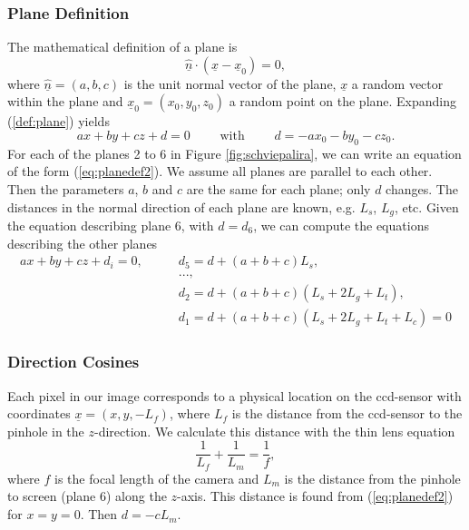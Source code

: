 \documentclass[draft]{svjour3}                     %
\begin{document}
\subsubsection{Plane Definition}
The mathematical definition of a plane is
\begin{equation}
	\label{def:plane}
	\underline{\hat{n}} \cdot (\underline{x}-\underline{x}_0) = 0,
\end{equation}
where $\underline{\hat{n}} = (a,b,c)$ is the unit normal vector of the plane, $\underline{x}$ a random vector within the plane and $\underline{x}_0=(x_0, y_0, z_0)$ a random point on the plane. Expanding (\ref{def:plane}) yields
\begin{equation}
	\label{eq:planedef2}
	ax+by+cz + d = 0 \qquad \mbox{ with } \qquad d = - a x_0 - b y_0 - c z_0.
\end{equation}
For each of the planes 2 to 6 in Figure \ref{fig:schviepalira}, we can write an equation of the form (\ref{eq:planedef2}). We assume all planes are parallel to each other. Then the parameters $a$, $b$ and $c$ are the same for each plane; only $d$ changes. The distances in the normal direction of each plane are known, e.g. $L_s$, $L_g$, etc. Given the equation describing plane 6, with $d=d_6$,
we can compute the equations describing the other planes
\begin{align}
a x + b y + c z + d_i = 0, \qquad  
& d_5 = d + (a+b+c) L_s, \nonumber \\
& ..., \nonumber \\ 
& d_2 = d + (a+b+c) (L_s+2L_g+L_t), \nonumber \\
\label{eq:planedef1}
& d_1 = d + (a+b+c) (L_s+2L_g+L_t+L_c) = 0 
\end{align}

\subsubsection{Direction Cosines}
Each pixel in our image corresponds to a physical location on the ccd-sensor with coordinates $\underline{x} = (x,y, -L_f)$, where $L_f$ is the distance from the ccd-sensor to the pinhole in the $z$-direction. We calculate this distance with the thin lens equation
\begin{equation}
 \frac{1}{L_f} + \frac{1}{L_m} = \frac{1}{f},
\end{equation}
where $f$ is the focal length of the camera and $L_m$ is the distance from the pinhole to screen (plane 6) along the $z$-axis. This distance is found from (\ref{eq:planedef2}) for $x=y=0$. Then $d = - c L_m$.
\end{document}
